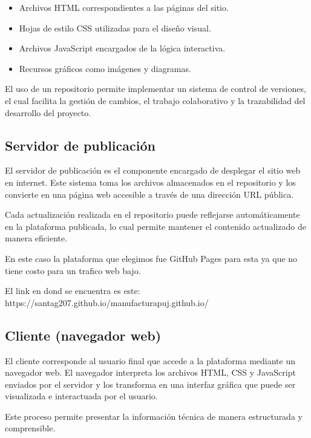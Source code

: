 \documentclass[12pt,letterpaper]{article}
\begin{document}
\begin{itemize}

\item Archivos HTML correspondientes a las páginas del sitio.
\item Hojas de estilo CSS utilizadas para el diseño visual.
\item Archivos JavaScript encargados de la lógica interactiva.
\item Recursos gráficos como imágenes y diagramas.

\end{itemize}

El uso de un repositorio permite implementar un sistema de control de versiones, el cual facilita la gestión de cambios, el trabajo colaborativo y la trazabilidad del desarrollo del proyecto.

\subsection{Servidor de publicación}

El servidor de publicación es el componente encargado de desplegar el sitio web en internet. Este sistema toma los archivos almacenados en el repositorio y los convierte en una página web accesible a través de una dirección URL pública.

Cada actualización realizada en el repositorio puede reflejarse automáticamente en la plataforma publicada, lo cual permite mantener el contenido actualizado de manera eficiente.

En este caso la plataforma que elegimos fue GitHub Pages para esta ya que no tiene costo para un trafico web bajo. 

El link en dond se encuentra es este: \\
https://santag207.github.io/manufacturapuj.github.io/

\subsection{Cliente (navegador web)}

El cliente corresponde al usuario final que accede a la plataforma mediante un navegador web. El navegador interpreta los archivos HTML, CSS y JavaScript enviados por el servidor y los transforma en una interfaz gráfica que puede ser visualizada e interactuada por el usuario.

Este proceso permite presentar la información técnica de manera estructurada y comprensible.
\end{document}
